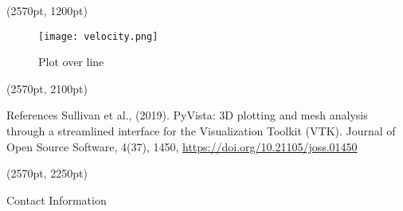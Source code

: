 \documentclass[final]{beamer}
\begin{document}
\begin{frame}[fragile]
\begin{textblock*}{800pt}(2570pt, 1200pt)

\begin{figure}
\texttt{[image: velocity.png]}
\caption{Plot over line}
\end{figure}
\end{textblock*}

\begin{textblock*}{800pt}(2570pt, 2100pt)
\begin{block}{References}
Sullivan et al., (2019). PyVista: 3D plotting and mesh analysis through a streamlined interface for the Visualization Toolkit (VTK). Journal of Open Source Software, 4(37), 1450, \url{https://doi.org/10.21105/joss.01450}
\end{block}
\end{textblock*}

\begin{textblock*}{800pt}(2570pt, 2250pt)
\begin{block}{Contact Information}
\end{block}
\doclicenseThis
\end{textblock*}

\end{frame}
\end{document}

